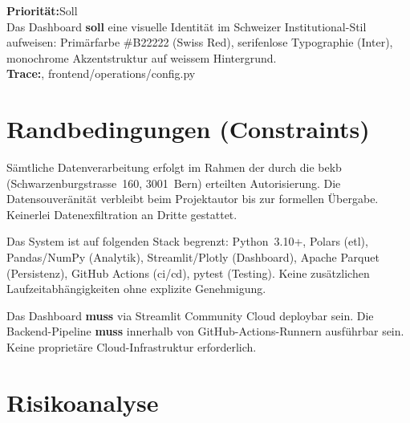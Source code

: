 \documentclass[11pt, a4paper, oneside, openany]{report}
\newcommand{\code}[1]{{\codefont\small\textcolor{DeepNavy}{#1}}}
\begin{document}
\vspace{6pt}

\begin{reqbox}
\textbf{Priorität:}\;Soll \\[4pt]
Das Dashboard \textbf{soll} eine visuelle Identität im Schweizer Institutional-Stil aufweisen: Primärfarbe \code{\#B22222} (Swiss Red), serifenlose Typographie (Inter), monochrome Akzentstruktur auf weissem Hintergrund. \\[4pt]
\textbf{Trace:}\;\code{frontend/operations/styles.py}, \code{frontend/operations/config.py}
\end{reqbox}

\section{Randbedingungen (Constraints)}
\label{sec:constraints}

\begin{constraintbox}
Sämtliche Datenverarbeitung erfolgt im Rahmen der durch die \gls{bekb} (Schwarzenburgstrasse~160, 3001~Bern) erteilten Autorisierung. Die Datensouveränität verbleibt beim Projektautor bis zur formellen Übergabe. Keinerlei Datenexfiltration an Dritte gestattet.
\end{constraintbox}

\vspace{6pt}

\begin{constraintbox}
Das System ist auf folgenden Stack begrenzt: Python~3.10+, Polars (\gls{etl}), Pandas/NumPy (Analytik), Streamlit/Plotly (Dashboard), Apache Parquet (Persistenz), GitHub Actions (\gls{ci}/\gls{cd}), pytest (Testing). Keine zusätzlichen Laufzeitabhängigkeiten ohne explizite Genehmigung.
\end{constraintbox}

\vspace{6pt}

\begin{constraintbox}
Das Dashboard \textbf{muss} via Streamlit Community Cloud deploybar sein. Die Backend-Pipeline \textbf{muss} innerhalb von GitHub-Actions-Runnern ausführbar sein. Keine proprietäre Cloud-Infrastruktur erforderlich.
\end{constraintbox}

\section{Risikoanalyse}
\label{sec:risiko}
\end{document}
